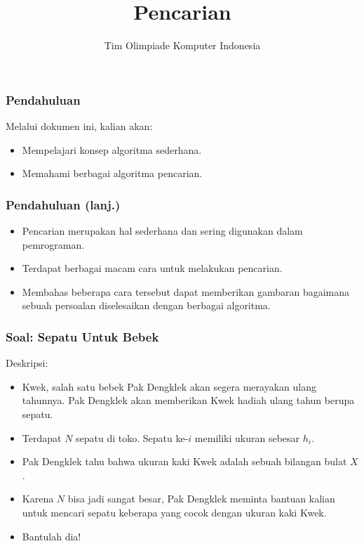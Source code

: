 

\title{Pencarian}
\author{Tim Olimpiade Komputer Indonesia}
\date{}



\begin{frame}
\titlepage
\end{frame}

\begin{frame}
\frametitle{Pendahuluan}
Melalui dokumen ini, kalian akan:
\begin{itemize}
  \item Mempelajari konsep algoritma sederhana.
  \item Memahami berbagai algoritma pencarian.
\end{itemize}
\end{frame}

\begin{frame}
\frametitle{Pendahuluan (lanj.)}
\begin{itemize}
  \item Pencarian merupakan hal sederhana dan sering digunakan dalam pemrograman.
  \item Terdapat berbagai macam cara untuk melakukan pencarian. 
  \item Membahas beberapa cara tersebut dapat memberikan gambaran bagaimana sebuah persoalan diselesaikan dengan berbagai algoritma.
\end{itemize}
\end{frame}

\begin{frame}
\frametitle{Soal: Sepatu Untuk Bebek}
Deskripsi:
\begin{itemize}
  \item Kwek, salah satu bebek Pak Dengklek akan segera merayakan ulang tahunnya. Pak Dengklek akan memberikan Kwek hadiah ulang tahun berupa sepatu.
  \item Terdapat $N$ sepatu di toko. Sepatu ke-$i$ memiliki ukuran sebesar $h_i$.
  \item Pak Dengklek tahu bahwa ukuran kaki Kwek adalah sebuah bilangan bulat $X$.
  \item Karena $N$ bisa jadi sangat besar, Pak Dengklek meminta bantuan kalian untuk mencari sepatu keberapa yang cocok dengan ukuran kaki Kwek.
  \item Bantulah dia!
\end{itemize}
\end{frame}

